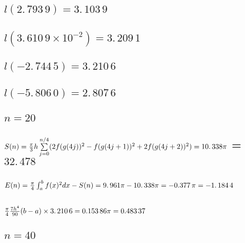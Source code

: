 \documentclass{article}
\begin{document}
\subsection{$l(2.\,\allowbreak 793\,9)=\allowbreak 3.\,\allowbreak 103\,9$}

\subsection{$l(3.\,\allowbreak 610\,9\times 10^{-2})=\allowbreak
3.\,\allowbreak 209\,1$}

\subsection{$l(-2.\,\allowbreak 744\,5)=\allowbreak 3.\,\allowbreak 210\,6$}

\subsection{$l(-5.\,\allowbreak 806\,0)=\allowbreak 2.\,\allowbreak 807\,6$}

\subsection{$n=20$}

\subsection{$S(n)=\frac{\protect\pi }{3}h\sum%
\limits_{j=0}^{n/4}(2f(g(4j))^{2}-f(g(4j+1))^{2}+2f(g(4j+2))^{2})=%
\allowbreak 10.\,\allowbreak 338\protect\pi $ = $32.\,\allowbreak 478$}

\subsection{$E(n)=\frac{\protect\pi }{4}\protect\int%
_{a}^{b}f(x)^{2}dx-S(n)=9.\,\allowbreak 961\protect\pi -10.\,\allowbreak 338%
\protect\pi =\allowbreak -0.377\,\protect\pi =-1.\,\allowbreak 184\,4$}

\subsection{$\frac{\protect\pi }{4}\frac{7h^{4}}{90}(b-a)\times
3.\,\allowbreak 210\,6=\allowbreak 0.153\,86\protect\pi =\allowbreak
0.483\,37$}

\bigskip

\subsection{$n=40$}
\end{document}
